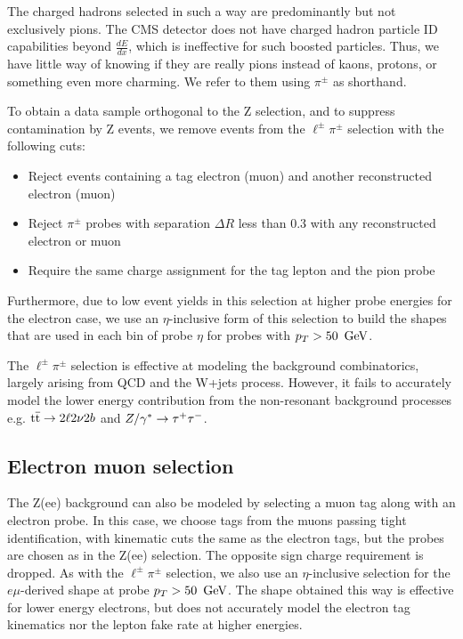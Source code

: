 The charged hadrons selected in such a way are predominantly but not exclusively pions.
The CMS detector does not have charged hadron particle ID capabilities beyond $\frac{dE}{dx}$,
which is ineffective for such boosted particles.
Thus, we have little way of knowing if they are really pions
instead of kaons, protons, or something even more charming.
We refer to them using $\pi^{\pm}$ as shorthand.

To obtain a data sample orthogonal to the Z selection, and to suppress contamination by Z events,
we remove events from the \ensuremath{\ell^{\pm}\pi^{\pm}} selection with the following cuts:
\begin{itemize}
\item Reject events containing a tag electron (muon) and another reconstructed electron (muon)
\item Reject \ensuremath{\pi^{\pm}} probes with separation $\Delta R$ less than 0.3 with any reconstructed electron or muon
\item Require the same charge assignment for the tag lepton and the pion probe
\end{itemize}

Furthermore, due to low event yields in this selection at higher probe energies for the electron case,
we use an $\eta$-inclusive form of this selection to build the shapes that are used in each bin of probe $\eta$ for probes with $p_{T} > 50~\,\text{Ge\hspace{-.08em}V}$.

The \ensuremath{\ell^{\pm}\pi^{\pm}} selection is effective at modeling the background combinatorics, largely
arising from QCD and the W+jets process. However, it fails to accurately
model the lower energy contribution from the non-resonant background processes e.g. ${\mathrm{t}\overline{\mathrm{t}}} \to 2\ell 2\nu 2b$ and $Z/\gamma^*\to\tau^+\tau^-$.
\subsection{Electron muon selection}
The Z(ee) background can also be modeled by selecting a muon tag along with an electron probe.
In this case, we choose tags from the muons passing tight identification, with kinematic cuts the same as the electron tags,
but the probes are chosen as in the Z(ee) selection. The opposite sign charge requirement is dropped. 
As with the \ensuremath{\ell^{\pm}\pi^{\pm}} selection, we also use an $\eta$-inclusive selection for the \ensuremath{e\mu}-derived shape at probe $p_{T} > 50~\,\text{Ge\hspace{-.08em}V}$.
The shape obtained this way is effective for lower energy electrons, but does not accurately model the electron tag kinematics nor the lepton fake rate at higher energies.


